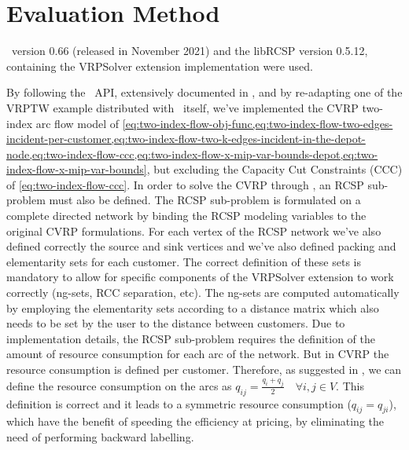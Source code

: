 \section{Evaluation Method}
\label{sec:results-evaluation-method}


\bapcod\ version 0.66 (released in November 2021) and the libRCSP version 0.5.12,
containing the VRPSolver extension implementation were used.

By following the \bapcod\ API, extensively documented in \textcite{sadykov2021},
and by re-adapting one of the VRPTW example distributed with \bapcod\ itself,
we've implemented the CVRP two-index arc flow model
of \cref{eq:two-index-flow-obj-func,eq:two-index-flow-two-edges-incident-per-customer,eq:two-index-flow-two-k-edges-incident-in-the-depot-node,eq:two-index-flow-ccc,eq:two-index-flow-x-mip-var-bounds-depot,eq:two-index-flow-x-mip-var-bounds},
but excluding the Capacity Cut Constraints (CCC) of \cref{eq:two-index-flow-ccc}.
In order to solve the CVRP through \bapcod, an RCSP sub-problem must also be defined.
The RCSP sub-problem is formulated on a complete directed network by
binding the RCSP modeling variables to the original CVRP formulations.
For each vertex of the RCSP network we've also defined correctly the source
and sink vertices and we've also defined packing and elementarity sets
for each customer.
The correct definition of these sets is mandatory to allow for specific
components of the VRPSolver extension to work correctly (ng-sets, RCC separation, etc).
The ng-sets are computed automatically by employing the elementarity sets
according to a distance matrix which also needs to be set by the user
to the distance between customers.
Due to implementation details, the RCSP sub-problem requires
the definition of the amount of resource consumption for each arc of the network.
But in CVRP the resource consumption is defined per customer.
Therefore, as suggested in \textcite{pessoa2020a}, we can define the resource consumption
on the arcs as $q_{ij} = \frac{q_{i} + q_{j}}{2} \quad \forall i, j \in V$.
This definition is correct and it leads to a symmetric resource consumption ($q_{ij} = q_{ji}$),
which have the benefit of speeding the efficiency at pricing,
by eliminating the need of performing backward labelling.

